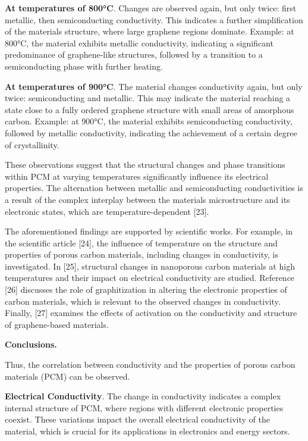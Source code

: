 \textbf{At temperatures of 800°C}. Changes are observed again, but only
twice: first metallic, then semiconducting conductivity. This indicates
a further simplification of the material\textquotesingle s structure,
where large graphene regions dominate. Example: at 800°C, the material
exhibits metallic conductivity, indicating a significant predominance of
graphene-like structures, followed by a transition to a semiconducting
phase with further heating.

\textbf{At temperatures of 900°C}. The material changes conductivity
again, but only twice: semiconducting and metallic. This may indicate
the material reaching a state close to a fully ordered graphene
structure with small areas of amorphous carbon. Example: at 900°C, the
material exhibits semiconducting conductivity, followed by metallic
conductivity, indicating the achievement of a certain degree of
crystallinity.

These observations suggest that the structural changes and phase
transitions within PCM at varying temperatures significantly influence
its electrical properties. The alternation between metallic and
semiconducting conductivities is a result of the complex interplay
between the material\textquotesingle s microstructure and its electronic
states, which are temperature-dependent {[}23{]}.

The aforementioned findings are supported by scientific works. For
example, in the scientific article {[}24{]}, the influence of
temperature on the structure and properties of porous carbon materials,
including changes in conductivity, is investigated. In {[}25{]},
structural changes in nanoporous carbon materials at high temperatures
and their impact on electrical conductivity are studied. Reference
{[}26{]} discusses the role of graphitization in altering the electronic
properties of carbon materials, which is relevant to the observed
changes in conductivity. Finally, {[}27{]} examines the effects of
activation on the conductivity and structure of graphene-based
materials.

\textbf{Conclusions.}

Thus, the correlation between conductivity and the properties of porous
carbon materials (PCM) can be observed.

\textbf{Electrical Conductivity}. The change in conductivity indicates a
complex internal structure of PCM, where regions with different
electronic properties coexist. These variations impact the overall
electrical conductivity of the material, which is crucial for its
applications in electronics and energy sectors.

